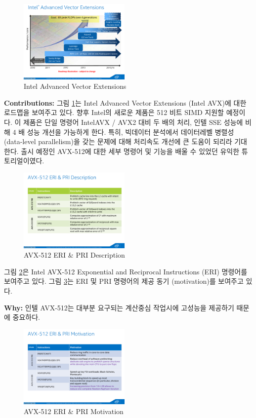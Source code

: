 \documentclass[twocolumn]{article}
\begin{document}
\begin{figure}[htb]
        \centering
        \includegraphics[width=0.48\textwidth]{intel-avx.pdf}
        \caption{Intel Advanced Vector Extensions}
        \label{fig:intel-avx}
\end{figure}

\noindent
\textbf{Contributions:} 그림 \ref{fig:intel-avx}는 Intel Advanced Vector Extensions (Intel AVX)에 대한 로드맵을 보여주고 있다.
향후 Intel의 새로운 제품은 512 비트 SIMD 지원할 예정이다. 이 제품은 단일 명령어 IntelAVX / AVX2 대비 두 배의 처리, 인텔 SSE 성능에 비해 4 배 성능 개선을 가능하게 한다. 특히, 빅데이터 분석에서 데이터레벨 병렬성 (data-level parallelism)을 갖는 문제에 대해 처리속도 개선에 큰 도움이 되리라 기대한다. 출시 예정인 AVX-512에 대한 세부 명령어 및 기능을 배울 수 있었던 유익한 튜토리얼이였다.

\begin{figure}[htb]
        \centering
        \includegraphics[width=0.48\textwidth]{intel-table.pdf}
        \caption{AVX-512 ERI \& PRI Description}
        \label{fig:intel-avx-description}
\end{figure}

그림 \ref{fig:intel-avx-description}은 Intel AVX-512 Exponential and Reciprocal Instructions (ERI) 명령어를 보여주고 있다. 그림 \ref{fig:intel-avx-512}는 ERI 및 PRI 명령어의 제공 동기 (motivation)를 보여주고 있다.

\noindent
\textbf{Why:} 
인텔 AVX-512는 대부분 요구되는 계산중심 작업시에 고성능을 제공하기 때문에 중요하다.

\begin{figure}[htb]
        \centering
        \includegraphics[width=0.48\textwidth]{intel-avx-512.pdf}
        \caption{AVX-512 ERI \& PRI Motivation}
        \label{fig:intel-avx-512}
\end{figure}
\end{document}
